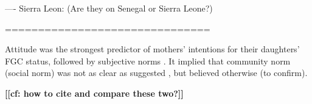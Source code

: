 \documentclass[12pt,]{article}
\newcommand{\comment}[1]{\textbf{[[#1]]}}
\begin{document}
---- Sierra Leon: 
\cite{ShelHern06, ShelHern13}  (Are they on Senegal or Sierra Leone?)

===============================

Attitude was the strongest predictor of mothers' intentions for their daughters' FGC status, followed by subjective norms \cite{PashPonn16}. It implied that community norm (social norm) was not as clear as suggested \cite{EffeVogt15}, but believed otherwise \cite{DuncWand11, Hayf06, Mack96, Mack00, Mack06, Youn02} (to confirm).


\comment{cf: how to cite \cite{AkhmWord13,EffeVogt15} and compare these two?}




\end{document}
